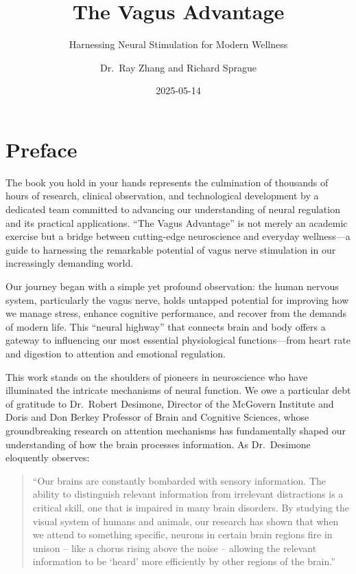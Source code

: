 \documentclass[
  Letterpaper,
]{scrbook}
\title{The Vagus Advantage}
\subtitle{Harnessing Neural Stimulation for Modern Wellness}
\author{Dr.~Ray Zhang and Richard Sprague}
\date{2025-05-14}
\renewcommand*\contentsname{Table of contents}
\newcommand\contentsname{Table of contents}
\begin{document}
\frontmatter
\maketitle

\renewcommand*\contentsname{Table of contents}
{
\setcounter{tocdepth}{2}
\tableofcontents
}

\mainmatter
{}

\chapter*{Preface}\label{preface}


The book you hold in your hands represents the culmination of thousands
of hours of research, clinical observation, and technological
development by a dedicated team committed to advancing our understanding
of neural regulation and its practical applications. ``The Vagus
Advantage'' is not merely an academic exercise but a bridge between
cutting-edge neuroscience and everyday wellness---a guide to harnessing
the remarkable potential of vagus nerve stimulation in our increasingly
demanding world.

Our journey began with a simple yet profound observation: the human
nervous system, particularly the vagus nerve, holds untapped potential
for improving how we manage stress, enhance cognitive performance, and
recover from the demands of modern life. This ``neural highway'' that
connects brain and body offers a gateway to influencing our most
essential physiological functions---from heart rate and digestion to
attention and emotional regulation.

This work stands on the shoulders of pioneers in neuroscience who have
illuminated the intricate mechanisms of neural function. We owe a
particular debt of gratitude to Dr.~Robert Desimone, Director of the
McGovern Institute and Doris and Don Berkey Professor of Brain and
Cognitive Sciences, whose groundbreaking research on attention
mechanisms has fundamentally shaped our understanding of how the brain
processes information. As Dr.~Desimone eloquently observes:

\begin{quote}
``Our brains are constantly bombarded with sensory information. The
ability to distinguish relevant information from irrelevant distractions
is a critical skill, one that is impaired in many brain disorders. By
studying the visual system of humans and animals, our research has shown
that when we attend to something specific, neurons in certain brain
regions fire in unison -- like a chorus rising above the noise --
allowing the relevant information to be `heard' more efficiently by
other regions of the brain.''
\end{quote}
\end{document}
